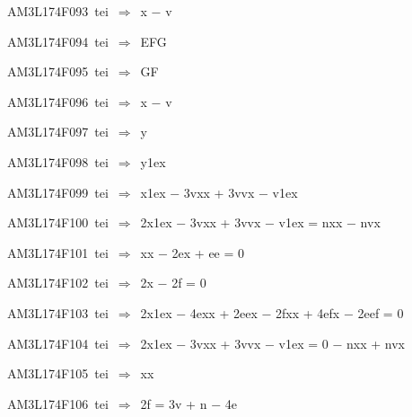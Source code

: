 {\sixrm AM3L174F093\ {\sixit tei}\ }$\Rightarrow$\ {\tenit x} − {\tenit v}\par\smallskip
{\sixrm AM3L174F094\ {\sixit tei}\ }$\Rightarrow$\ EFG\par\smallskip
{\sixrm AM3L174F095\ {\sixit tei}\ }$\Rightarrow$\ GF\par\smallskip
{\sixrm AM3L174F096\ {\sixit tei}\ }$\Rightarrow$\ {\tenit x} − {\tenit v}\par\smallskip
{\sixrm AM3L174F097\ {\sixit tei}\ }$\Rightarrow$\ {\tenit y}\par\smallskip
{\sixrm AM3L174F098\ {\sixit tei}\ }$\Rightarrow$\ {\tenit y}\raise1ex\hbox{}\par\smallskip
{\sixrm AM3L174F099\ {\sixit tei}\ }$\Rightarrow$\ {\tenit x}\raise1ex\hbox{} − 3{\tenit vxx} + 3{\tenit vvx} − {\tenit v}\raise1ex\hbox{}\par\smallskip
{\sixrm AM3L174F100\ {\sixit tei}\ }$\Rightarrow$\ 2{\tenit x}\raise1ex\hbox{} − 3{\tenit vxx} + 3{\tenit vvx} − {\tenit v}\raise1ex\hbox{} = {\tenit nxx} − {\tenit nvx}\par\smallskip
{\sixrm AM3L174F101\ {\sixit tei}\ }$\Rightarrow$\ {\tenit xx} − 2{\tenit ex} + {\tenit ee} = 0\par\smallskip
{\sixrm AM3L174F102\ {\sixit tei}\ }$\Rightarrow$\ 2{\tenit x} − 2{\tenit f} = 0\par\smallskip
{\sixrm AM3L174F103\ {\sixit tei}\ }$\Rightarrow$\ 2{\tenit x}\raise1ex\hbox{} − 4{\tenit exx} + 2{\tenit eex}
− 2{\tenit fxx} + 4{\tenit efx} − 2{\tenit eef} = 0\par\smallskip
{\sixrm AM3L174F104\ {\sixit tei}\ }$\Rightarrow$\ 2{\tenit x}\raise1ex\hbox{} − 3{\tenit vxx} + 3{\tenit vvx} − {\tenit v}\raise1ex\hbox{} = 0 
− {\tenit nxx} + {\tenit nvx}\par\smallskip
{\sixrm AM3L174F105\ {\sixit tei}\ }$\Rightarrow$\ {\tenit xx}\par\smallskip
{\sixrm AM3L174F106\ {\sixit tei}\ }$\Rightarrow$\ 2{\tenit f} = 3{\tenit v} + {\tenit n} − 4{\tenit e}\par\smallskip

